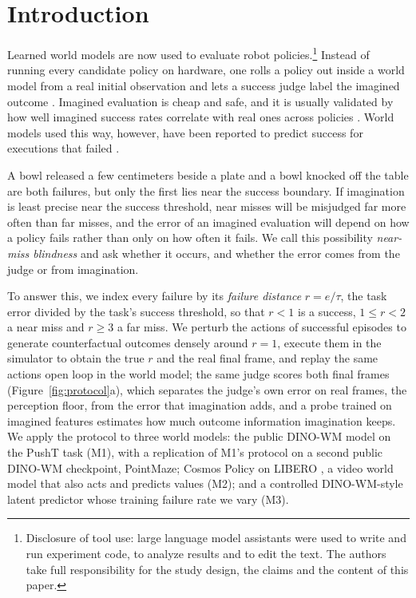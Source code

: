 \documentclass[10pt]{article}
\begin{document}
\section{Introduction}
\label{sec:intro}

Learned world models are now used to evaluate robot policies.\footnote{Disclosure of tool use: large language model assistants were used to write and run experiment code, to analyze results and to edit the text. The authors take full responsibility for the study design, the claims and the content of this paper.} Instead of running every candidate policy on hardware, one rolls a policy out inside a world model from a real initial observation and lets a success judge label the imagined outcome \citep{quevedo2026worldgym, li2025worldeval, guo2026ctrlworld}. Imagined evaluation is cheap and safe, and it is usually validated by how well imagined success rates correlate with real ones across policies \citep{li2024simpler, geminirobotics2025veo}. World models used this way, however, have been reported to predict success for executions that failed \citep{xu2026curewm, yang2026mirabench, wang2026proworld}.

A bowl released a few centimeters beside a plate and a bowl knocked off the table are both failures, but only the first lies near the success boundary. If imagination is least precise near the success threshold, near misses will be misjudged far more often than far misses, and the error of an imagined evaluation will depend on how a policy fails rather than only on how often it fails. We call this possibility \emph{near-miss blindness} and ask whether it occurs, and whether the error comes from the judge or from imagination.

To answer this, we index every failure by its \emph{failure distance} $r=e/\tau$, the task error divided by the task's success threshold, so that $r<1$ is a success, $1\le r<2$ a near miss and $r\ge 3$ a far miss. We perturb the actions of successful episodes to generate counterfactual outcomes densely around $r=1$, execute them in the simulator to obtain the true $r$ and the real final frame, and replay the same actions open loop in the world model; the same judge scores both final frames (Figure~\ref{fig:protocol}a), which separates the judge's own error on real frames, the perception floor, from the error that imagination adds, and a probe trained on imagined features estimates how much outcome information imagination keeps. We apply the protocol to three world models: the public DINO-WM model \citep{zhou2025dinowm} on the PushT task \citep{florence2021ibc, chi2023diffusionpolicy} (M1), with a replication of M1's protocol on a second public DINO-WM checkpoint, PointMaze; Cosmos Policy on LIBERO \citep{kim2026cosmospolicy, liu2023libero}, a video world model that also acts and predicts values (M2); and a controlled DINO-WM-style latent predictor whose training failure rate we vary (M3).
\end{document}

